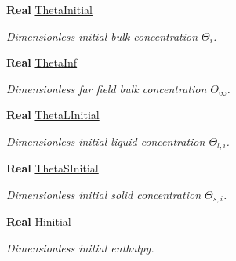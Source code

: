 \begin{DoxyCompactItemize}
\mbox{\label{class_mushy_layer_params_ae326e39ee5950300791ce6d4a03657fc}} 
\textbf{ Real} \hyperlink{class_mushy_layer_params_ae326e39ee5950300791ce6d4a03657fc}{Theta\+Initial}
\begin{DoxyCompactList}\small\item\em Dimensionless initial bulk concentration $ \Theta_i $. \end{DoxyCompactList}\item 
\mbox{\label{class_mushy_layer_params_ae6ea963354fd718de64b7fefc8d06446}} 
\textbf{ Real} \hyperlink{class_mushy_layer_params_ae6ea963354fd718de64b7fefc8d06446}{Theta\+Inf}
\begin{DoxyCompactList}\small\item\em Dimensionless far field bulk concentration $ \Theta_\infty $. \end{DoxyCompactList}\item 
\mbox{\label{class_mushy_layer_params_a3781f0d56c7054c5f28a7004324a0891}} 
\textbf{ Real} \hyperlink{class_mushy_layer_params_a3781f0d56c7054c5f28a7004324a0891}{Theta\+L\+Initial}
\begin{DoxyCompactList}\small\item\em Dimensionless initial liquid concentration $ \Theta_{l,i} $. \end{DoxyCompactList}\item 
\mbox{\label{class_mushy_layer_params_a71937d2796fc2c061fc8b4781355fd00}} 
\textbf{ Real} \hyperlink{class_mushy_layer_params_a71937d2796fc2c061fc8b4781355fd00}{Theta\+S\+Initial}
\begin{DoxyCompactList}\small\item\em Dimensionless initial solid concentration $ \Theta_{s,i} $. \end{DoxyCompactList}\item 
\mbox{\label{class_mushy_layer_params_ab2e1279e2b97f6b6bfbd79aef9f4fd07}} 
\textbf{ Real} \hyperlink{class_mushy_layer_params_ab2e1279e2b97f6b6bfbd79aef9f4fd07}{Hinitial}
\begin{DoxyCompactList}\small\item\em Dimensionless initial enthalpy. \end{DoxyCompactList}\item 

\end{DoxyCompactItemize}
